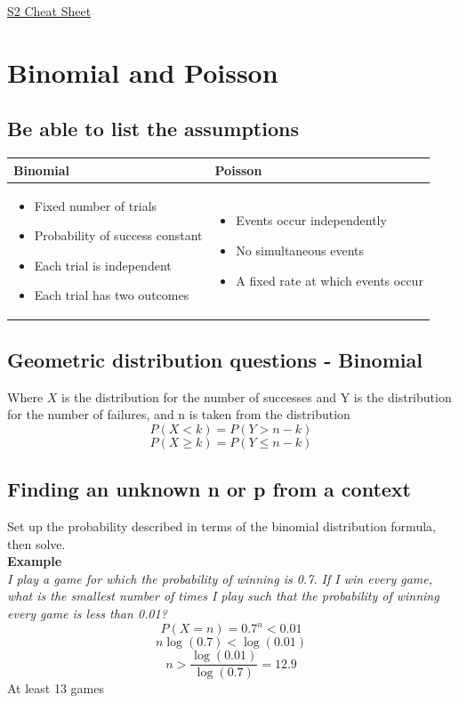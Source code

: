 \documentclass{article}[18pt]
\begin{document}
\begin{center}
\underline{\huge S2 Cheat Sheet}
\end{center}
\section{Binomial and Poisson}
\subsection{Be able to list the assumptions}
\begin{tabularx}{\textwidth}{|X|X|}
\hline
Binomial&Poisson\\
\hline
\begin{itemize}
\item Fixed number of trials
\item Probability of success constant
\item Each trial is independent
\item Each trial has two outcomes
\end{itemize}&
\begin{itemize}
\item Events occur independently
\item No simultaneous events
\item A fixed rate at which events occur
\end{itemize}\\
\hline
\end{tabularx}
\subsection{Geometric distribution questions - Binomial}
Where $X$ is the distribution for the number of successes and Y is the distribution for the number of failures, and n is taken from the distribution
$$P(X<k)=P(Y>n-k)$$
$$P(X\geqslant k)=P(Y\leqslant n-k)$$
\subsection{Finding an unknown n or p from a context}
Set up the probability described in terms of the binomial distribution formula, then solve.\\
\textbf{Example}\\
\textit{I play a game for which the probability of winning is 0.7. If I win every game, what is the smallest number of times I play such that the probability of winning every game is less than 0.01?}\\
$$P(X=n)=0.7^n<0.01$$
$$n\log(0.7)<\log(0.01)$$
$$n>\frac{\log(0.01)}{\log(0.7)}=12.9$$
At least 13 games
\end{document}
